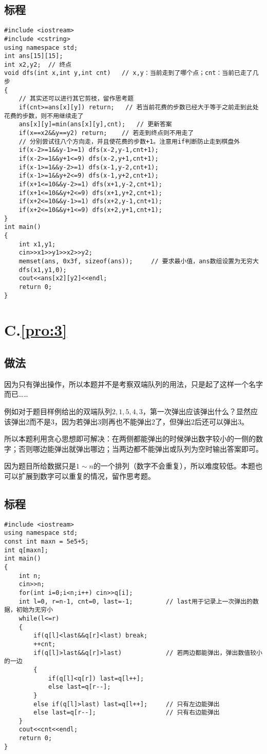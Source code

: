 \documentclass[
	lang=cn,
	color=blue
]{elegantbook}
\begin{document}
\section*{标程}
\begin{lstlisting}
#include <iostream>
#include <cstring>
using namespace std;
int ans[15][15];
int x2,y2;  // 终点
void dfs(int x,int y,int cnt)   // x,y：当前走到了哪个点；cnt：当前已走了几步
{
    // 其实还可以进行其它剪枝，留作思考题
    if(cnt>=ans[x][y]) return;   // 若当前花费的步数已经大于等于之前走到此处花费的步数，则不用继续走了
    ans[x][y]=min(ans[x][y],cnt);   // 更新答案
    if(x==x2&&y==y2) return;    // 若走到终点则不用走了
    // 分别尝试往八个方向走，并且使花费的步数+1。注意用if判断防止走到棋盘外
    if(x-2>=1&&y-1>=1) dfs(x-2,y-1,cnt+1);
    if(x-2>=1&&y+1<=9) dfs(x-2,y+1,cnt+1);
    if(x-1>=1&&y-2>=1) dfs(x-1,y-2,cnt+1);
    if(x-1>=1&&y+2<=9) dfs(x-1,y+2,cnt+1);
    if(x+1<=10&&y-2>=1) dfs(x+1,y-2,cnt+1);
    if(x+1<=10&&y+2<=9) dfs(x+1,y+2,cnt+1);
    if(x+2<=10&&y-1>=1) dfs(x+2,y-1,cnt+1);
    if(x+2<=10&&y+1<=9) dfs(x+2,y+1,cnt+1);
}
int main()
{
    int x1,y1;
    cin>>x1>>y1>>x2>>y2;
    memset(ans, 0x3f, sizeof(ans));     // 要求最小值，ans数组设置为无穷大
    dfs(x1,y1,0);
    cout<<ans[x2][y2]<<endl;
    return 0;
}
\end{lstlisting}

\chapter*{C.\quad \ref*{pro:3}}
\section*{做法}
因为只有弹出操作，所以本题并不是考察双端队列的用法，只是起了这样一个名字而已……

例如对于题目样例给出的双端队列$2,1,5,4,3$，第一次弹出应该弹出什么？显然应该弹出$2$而不是$3$，因为若弹出3则再也不能弹出$2$了，但弹出$2$后还可以弹出$3$。

所以本题利用贪心思想即可解决：在两侧都能弹出的时候弹出数字较小的一侧的数字；否则哪边能弹出就弹出哪边；当两边都不能弹出或队列为空时输出答案即可。

因为题目所给数据只是$1 \sim n$的一个排列（数字不会重复），所以难度较低。本题也可以扩展到数字可以重复的情况，留作思考题。

\section*{标程}
\begin{lstlisting}
#include <iostream>
using namespace std;
const int maxn = 5e5+5;
int q[maxn];
int main()
{
    int n;
    cin>>n;
    for(int i=0;i<n;i++) cin>>q[i];
    int l=0, r=n-1, cnt=0, last=-1;         // last用于记录上一次弹出的数据，初始为无穷小
    while(l<=r)
    {
        if(q[l]<last&&q[r]<last) break;
        ++cnt;
        if(q[l]>last&&q[r]>last)            // 若两边都能弹出，弹出数值较小的一边
        {
            if(q[l]<q[r]) last=q[l++];
            else last=q[r--];
        }
        else if(q[l]>last) last=q[l++];     // 只有左边能弹出
        else last=q[r--];                   // 只有右边能弹出
    }
    cout<<cnt<<endl;
    return 0;
}
\end{lstlisting}
\end{document}
